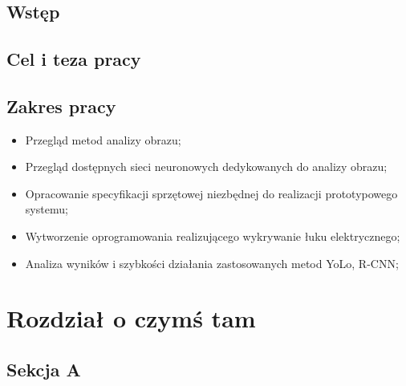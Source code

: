 \documentclass[a4paper,12pt]{book} %
\begin{document}
\sloppy



\thispagestyle{empty}



\newpage{}

\thispagestyle{empty}

\newpage{}



\tableofcontents{}

\chapter{}
\section{Wstęp}
\label{Wstep}
\lipsum[1]

\section{Cel i teza pracy}
\label{Cel i teza pracy}
\lipsum[1]

\section{Zakres pracy}
\label{Zakres pracy}
\begin{itemize}
	\item Przegląd metod analizy obrazu;
	\item Przegląd dostępnych sieci neuronowych dedykowanych do analizy obrazu;
	\item Opracowanie specyfikacji sprzętowej niezbędnej do realizacji prototypowego systemu;
	\item Wytworzenie oprogramowania realizującego wykrywanie łuku elektrycznego;
	\item Analiza wyników i szybkości działania zastosowanych metod YoLo, R-CNN;
\end{itemize}
\lipsum[1]

\chapter{Rozdział o czymś tam}

\section{Sekcja A}
\end{document}
